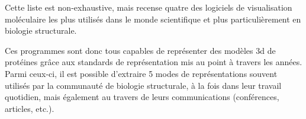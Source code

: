 
Cette liste est non-exhaustive, mais recense quatre des logiciels de visualisation moléculaire les plus utilisés dans le monde scientifique et plus particulièrement en biologie structurale.

Ces programmes sont donc tous capables de représenter des modèles 3d de protéines grâce aux standards de représentation mis au point à travers les années. Parmi ceux-ci, il est possible d'extraire 5 modes  de représentations souvent utilisés par la communauté de biologie structurale, à la fois dans leur travail quotidien, mais également au travers de leurs communications (conférences, articles, etc.).

